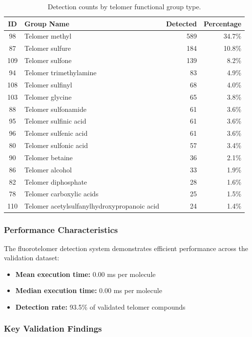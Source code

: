 \begin{table}[htbp]
\centering
\caption{Detection counts by telomer functional group type.}
\label{tab:telomer_groups}
\begin{tabular}{clrr}
\toprule
\textbf{ID} & \textbf{Group Name} & \textbf{Detected} & \textbf{Percentage} \\
\midrule
98 & Telomer methyl & 589 & 34.7\% \\
87 & Telomer sulfure & 184 & 10.8\% \\
109 & Telomer sulfone & 139 & 8.2\% \\
94 & Telomer trimethylamine & 83 & 4.9\% \\
108 & Telomer sulfinyl & 68 & 4.0\% \\
103 & Telomer glycine & 65 & 3.8\% \\
88 & Telomer sulfonamide & 61 & 3.6\% \\
95 & Telomer sulfinic acid & 61 & 3.6\% \\
96 & Telomer sulfenic acid & 61 & 3.6\% \\
80 & Telomer sulfonic acid & 57 & 3.4\% \\
90 & Telomer betaine & 36 & 2.1\% \\
86 & Telomer alcohol & 33 & 1.9\% \\
82 & Telomer diphosphate & 28 & 1.6\% \\
78 & Telomer carboxylic acids & 25 & 1.5\% \\
110 & Telomer acetylsulfanylhydroxypropanoic acid & 24 & 1.4\% \\
\bottomrule
\end{tabular}
\end{table}

\subsubsection*{Performance Characteristics}

The fluorotelomer detection system demonstrates efficient performance across the validation dataset:

\begin{itemize}
\item \textbf{Mean execution time:} 0.00 ms per molecule
\item \textbf{Median execution time:} 0.00 ms per molecule
\item \textbf{Detection rate:} 93.5\% of validated telomer compounds
\end{itemize}

\subsubsection*{Key Validation Findings}

